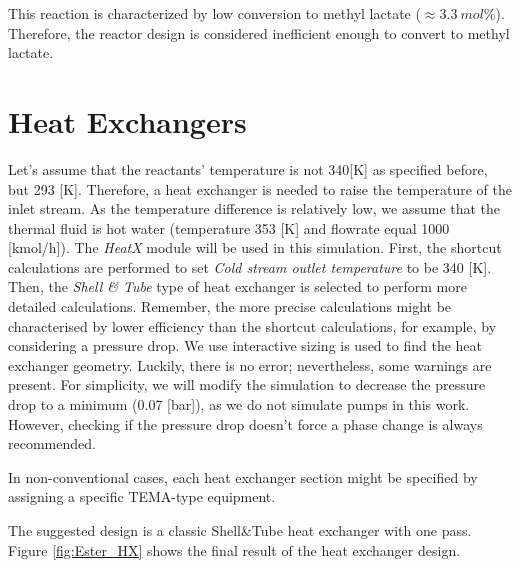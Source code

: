 This reaction is characterized by low conversion to methyl lactate ($\approx 3.3~mol\%$). Therefore, the reactor design is considered inefficient enough to convert to methyl lactate.

\section{Heat Exchangers}

Let's assume that the reactants' temperature is not 340[K] as specified before, but 293 [K]. Therefore, a heat exchanger is needed to raise the temperature of the inlet stream. As the temperature difference is relatively low, we assume that the thermal fluid is hot water (temperature 353 [K] and flowrate equal 1000 [kmol/h]). The \textit{HeatX} module will be used in this simulation. First, the shortcut calculations are performed to set \textit{Cold stream outlet temperature} to be 340 [K]. Then, the \textit{Shell \& Tube} type of heat exchanger is selected to perform more detailed calculations. Remember, the more precise calculations might be characterised by lower efficiency than the shortcut calculations, for example, by considering a pressure drop.
We use interactive sizing is used to find the heat exchanger geometry. Luckily, there is no error; nevertheless, some warnings are present. For simplicity, we will modify the simulation to decrease the pressure drop to a minimum (0.07 [bar]), as we do not simulate pumps in this work. However, checking if the pressure drop doesn't force a phase change is always recommended.

In non-conventional cases, each heat exchanger section might be specified by assigning a specific TEMA-type equipment.

The suggested design is a classic Shell\&Tube heat exchanger with one pass. Figure \ref{fig:Ester_HX} shows the final result of the heat exchanger design.

